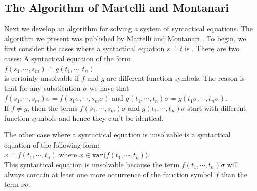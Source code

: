 \subsection{The Algorithm of Martelli and Montanari}
Next we develop an algorithm for solving a system of syntactical equations.
The algorithm we present was published by Martelli and Montanari
\cite{martelli:1982}.  
To begin, we first consider the cases where a syntactical equation $s \doteq t$ is .
There are two cases: A syntactical equation of the form
\\[0.2cm]
\hspace*{1.3cm}
$f(s_1,\cdots,s_m) \doteq g(t_1,\cdots, t_n)$ \\[0.2cm]
is certainly unsolvable if  $f$ and $g$ are different function symbols. The reason is that for any substitution
$\sigma$ we have that \\[0.2cm]
\hspace*{1.0cm} $f(s_1,\cdots,s_m)\sigma = f(s_1\sigma,\cdots,s_m\sigma)$ \quad and \quad
                $g(t_1,\cdots, t_n)\sigma = g(t_1\sigma,\cdots,t_n\sigma)$. \\[0.2cm]
If $f \not = g$, then the terms  $f(s_1,\cdots,s_m)\sigma$ and $g(t_1,\cdots, t_n)\sigma$ start with different
function symbols and hence they can't be identical.

The other case where a syntactical equation is unsolvable is a syntactical equation of the following form:
\\[0.2cm]
\hspace*{1.3cm}
$x \doteq f(t_1,\cdots,t_n)$  \quad where $x \in \texttt{var}\big(f(t_1,\cdots,t_n)\big)$.
\\[0.2cm]
This syntactical equation is unsolvable because the term $f(t_1,\cdots,t_n)\sigma$ will always contain at least one more
occurrence of the function symbol $f$ than the term $x\sigma$.

